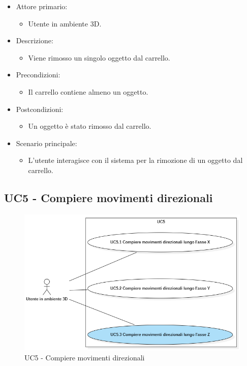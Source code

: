 \begin{itemize}
	
	\item Attore primario: 
	\begin{itemize}
		\item Utente in ambiente 3D.
	\end{itemize}
	\item Descrizione:
	\begin{itemize}
		\item Viene rimosso un singolo oggetto dal carrello.
	\end{itemize}
	
	\item Precondizioni:
	\begin{itemize}
		\item Il carrello contiene almeno un oggetto.
	\end{itemize}
	
	\item Postcondizioni:
	\begin{itemize}
		\item Un oggetto è stato rimosso dal carrello.
	\end{itemize}
	
	\item Scenario principale:
	\begin{itemize}
		\item L'utente interagisce con il sistema per la rimozione di un oggetto dal carrello.
	\end{itemize}
	
\end{itemize}

\pagebreak

\subsection{UC5 - Compiere movimenti direzionali}

\begin{figure}[H]
  \renewcommand{\thefigure}{6}
  \includegraphics[width=\linewidth]{./res/images/UC5.png}
  \caption{UC5 - Compiere movimenti direzionali}
  \label{fig:UC 5}
\end{figure}

